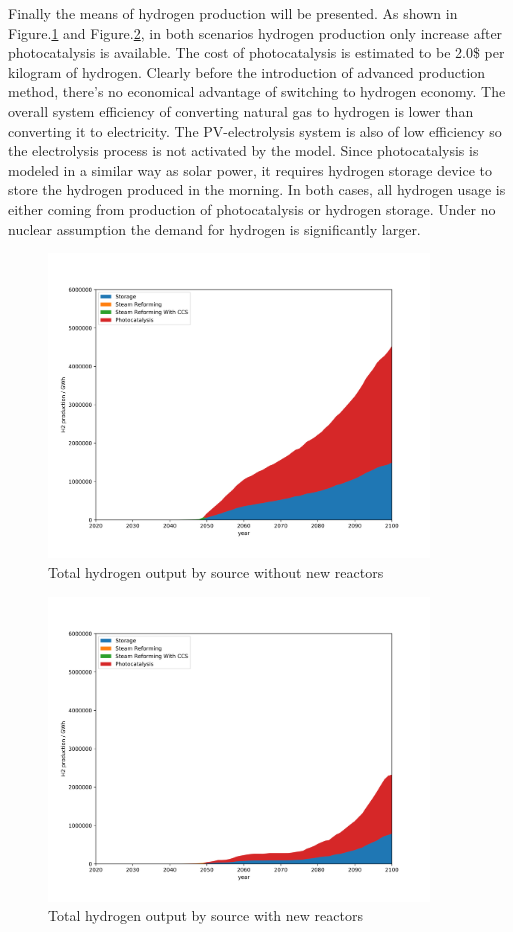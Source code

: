 \documentclass[14pt,a4paper]{article} %
\begin{document}
Finally the means of hydrogen production will be presented. As shown in Figure.\ref{fig:nonuch2} and Figure.\ref{fig:nuch2}, in both scenarios hydrogen production only increase after photocatalysis is available. The cost of photocatalysis is estimated to be 2.0\$ per kilogram of hydrogen\cite{pinaud2013technical}. Clearly before the introduction of advanced production method, there's no economical advantage of switching to hydrogen economy. The overall system efficiency of converting natural gas to hydrogen is lower than converting it to electricity. The PV-electrolysis system is also of low efficiency so the electrolysis process is not activated by the model. Since photocatalysis is modeled in a similar way as solar power, it requires hydrogen storage device to store the hydrogen produced in the morning. In both cases, all hydrogen usage is either coming from production of photocatalysis or hydrogen storage. Under no nuclear assumption the demand for hydrogen is significantly larger.
\begin{figure}[H]
  \centering
    \includegraphics[width=0.9\textwidth]{./plot/nonuc_h2.png}
  \caption{Total hydrogen output by source without new reactors}
  \label{fig:nonuch2}
\end{figure}
\begin{figure}[H]
  \centering
    \includegraphics[width=0.9\textwidth]{./plot/nuc_h2.png}
  \caption{Total hydrogen output by source with new reactors}
  \label{fig:nuch2}
\end{figure}
\end{document}
